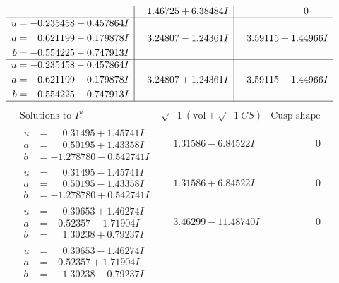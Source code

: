 \documentclass[1p]{elsarticle_modified}
\theoremstyle{definition}
\newcommand{\I}{\sqrt{-1}}
\begin{document}
$$\begin{array}{c|c|c}
 & \phantom{-}1.46725 + 6.38484 I & \phantom{-0.000000 } 0 \\ \hline\begin{aligned}
u &= -0.235458 + 0.457864 I \\
a &= \phantom{-}0.621199 - 0.179878 I \\
b &= -0.554225 - 0.747913 I\end{aligned}
 & \phantom{-}3.24807 - 1.24361 I & \phantom{-}3.59115 + 1.44966 I \\ \hline\begin{aligned}
u &= -0.235458 - 0.457864 I \\
a &= \phantom{-}0.621199 + 0.179878 I \\
b &= -0.554225 + 0.747913 I\end{aligned}
 & \phantom{-}3.24807 + 1.24361 I & \phantom{-}3.59115 - 1.44966 I\\
 \hline 
 \end{array}$$\newpage$$\begin{array}{c|c|c}  
\text{Solutions to }I^u_{1}& \I (\text{vol} + \sqrt{-1}CS) & \text{Cusp shape}\\
 \hline 
\begin{aligned}
u &= \phantom{-}0.31495 + 1.45741 I \\
a &= \phantom{-}0.50195 + 1.43358 I \\
b &= -1.278780 - 0.542741 I\end{aligned}
 & \phantom{-}1.31586 - 6.84522 I & \phantom{-0.000000 } 0 \\ \hline\begin{aligned}
u &= \phantom{-}0.31495 - 1.45741 I \\
a &= \phantom{-}0.50195 - 1.43358 I \\
b &= -1.278780 + 0.542741 I\end{aligned}
 & \phantom{-}1.31586 + 6.84522 I & \phantom{-0.000000 } 0 \\ \hline\begin{aligned}
u &= \phantom{-}0.30653 + 1.46274 I \\
a &= -0.52357 - 1.71904 I \\
b &= \phantom{-}1.30238 + 0.79237 I\end{aligned}
 & \phantom{-}3.46299 - 11.48740 I & \phantom{-0.000000 } 0 \\ \hline\begin{aligned}
u &= \phantom{-}0.30653 - 1.46274 I \\
a &= -0.52357 + 1.71904 I \\
b &= \phantom{-}1.30238 - 0.79237 I\end{aligned}

\end{array}$$
\end{document}
